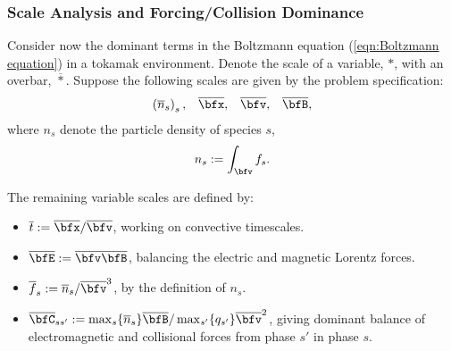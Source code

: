 \subsubsection*{Scale Analysis and Forcing/Collision Dominance}
    Consider now the dominant terms in the Boltzmann equation (\ref{eqn:Boltzmann equation}) in a tokamak environment. Denote the scale of a variable, $*$, with an overbar, $\overline{*}$. Suppose the following scales are given by the problem specification:
    \begin{align}
        \left(\overline{n}_{s}\right)_{s},         &&
        \overline{\bfx},                           &&
        \overline{\bfv},                           &&
        \overline{\bfB},
    \end{align}
    where $n_{s}$ denote the particle density of species $s$,
    \begin{equation}
        n_{s}  :=  \int_{\bfv}f_{s}.
    \end{equation}

    
    The remaining variable scales are defined by:
    \begin{itemize}
        \item  $\overline{t}           :=  \overline{\bfx}/\overline{\bfv}$, working on convective timescales.
        \item  $\overline{\bfE}        :=  \overline{\bfv}\overline{\bfB}$, balancing the electric and magnetic Lorentz forces. 
        \item  $\overline{f}_{s}       :=  \overline{n}_{s}/\overline{\bfv}^{3}$, by the definition of $n_{s}$.
        \item  $\overline{\bfC}_{ss'}  :=  \max_{s}\{\overline{n}_{s}\}\overline{\bfB}/\max_{s'}\{q_{s'}\}\overline{\bfv}^{2}$, giving dominant balance of electromagnetic and collisional forces from phase $s'$ in phase $s$. 
    \end{itemize}
    
